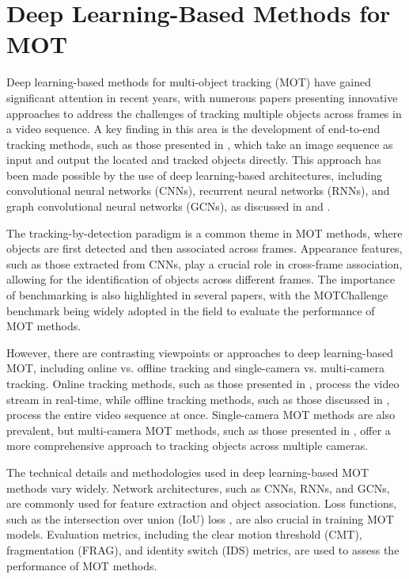 \documentclass[conference]{IEEEtran}
\begin{document}
\section{Deep Learning-Based Methods for MOT}
Deep learning-based methods for multi-object tracking (MOT) have gained significant attention in recent years, with numerous papers presenting innovative approaches to address the challenges of tracking multiple objects across frames in a video sequence. A key finding in this area is the development of end-to-end tracking methods, such as those presented in \cite{End-to-End Multi-Object Tracking with Global Response Map}, which take an image sequence as input and output the located and tracked objects directly. This approach has been made possible by the use of deep learning-based architectures, including convolutional neural networks (CNNs), recurrent neural networks (RNNs), and graph convolutional neural networks (GCNs), as discussed in \cite{Deep Learning in Video Multi-Object Tracking: A Survey} and \cite{Multiple Object Tracking in Recent Times: A Literature Review}.

The tracking-by-detection paradigm is a common theme in MOT methods, where objects are first detected and then associated across frames. Appearance features, such as those extracted from CNNs, play a crucial role in cross-frame association, allowing for the identification of objects across different frames. The importance of benchmarking is also highlighted in several papers, with the MOTChallenge benchmark \cite{MOTChallenge: A Benchmark for Single-Camera Multiple Target Tracking} being widely adopted in the field to evaluate the performance of MOT methods.

However, there are contrasting viewpoints or approaches to deep learning-based MOT, including online vs. offline tracking and single-camera vs. multi-camera tracking. Online tracking methods, such as those presented in \cite{End-to-End Multi-Object Tracking with Global Response Map}, process the video stream in real-time, while offline tracking methods, such as those discussed in \cite{Deep Learning in Video Multi-Object Tracking: A Survey}, process the entire video sequence at once. Single-camera MOT methods are also prevalent, but multi-camera MOT methods, such as those presented in \cite{Multiple Object Tracking in Recent Times: A Literature Review}, offer a more comprehensive approach to tracking objects across multiple cameras.

The technical details and methodologies used in deep learning-based MOT methods vary widely. Network architectures, such as CNNs, RNNs, and GCNs, are commonly used for feature extraction and object association. Loss functions, such as the intersection over union (IoU) loss \cite{End-to-End Multi-Object Tracking with Global Response Map}, are also crucial in training MOT models. Evaluation metrics, including the clear motion threshold (CMT), fragmentation (FRAG), and identity switch (IDS) metrics, are used to assess the performance of MOT methods.
\end{document}
